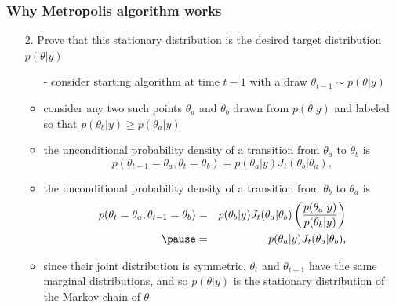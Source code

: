 \documentclass[10pt]{beamer}
\begin{document}
\begin{frame}

\frametitle{ Why Metropolis algorithm works}

  \begin{itemize}
  \item[2.] Prove that this stationary distribution is the desired target distribution $p(\theta|y)$
    \begin{itemize}
    \item[-] consider starting algorithm at time $t-1$ with a draw
      $\theta_{t-1} \sim p(\theta|y)$
    \item<2->[-] consider any two such points $\theta_a$ and $\theta_b$ drawn
      from $p(\theta|y)$ and labeled so that
      $p(\theta_b|y)\geq p(\theta_a|y)$
    \item<3->[-] the unconditional probability density of a transition from $\theta_a$ to $\theta_b$ is
      \vspace{-0.5\baselineskip}
      \begin{equation*}
        p(\theta_{t-1}=\theta_a,\theta_{t}=\theta_b)=
        p(\theta_a|y)J_t(\theta_b|\theta_a),
      \end{equation*}
      \vspace{-1\baselineskip}
    \item<4->[-] the unconditional probability density of a transition from $\theta_b$ to $\theta_a$ is
      \vspace{-0.5\baselineskip}
      \begin{eqnarray*}
        p(\theta_{t}=\theta_a,\theta_{t-1}=\theta_b) & = &
        p(\theta_b|y)J_t(\theta_a|\theta_b)\left(\frac{p(\theta_a|y)}{p(\theta_b|y)}\right)\\
        \pause &  = &  p(\theta_a|y)J_t(\theta_a|\theta_b),
      \end{eqnarray*}
      \pause
    \item<6->[-] since their joint distribution is symmetric, $\theta_t$ and
      $\theta_{t-1}$ have the same marginal distributions, and so
      $p(\theta|y)$ is the stationary distribution of the Markov chain of $\theta$
    \end{itemize}
  \end{itemize}

\end{frame}
\end{document}
